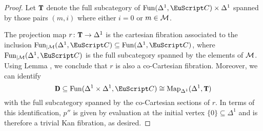 \begin{proof}
Let $\T$ denote the full subcategory of $\Fun(\Delta^1,\iC)\times \Delta^1$ spanned by those pairs $(m, i)$ where either $i = 0$ or $m\in \mathcal{M}$. 

The projection map $r \colon \T\to \Delta^1$ is the cartesian fibration associated to the inclusion 
$\Fun_{|\M}(\Delta^1,\iC) \subseteq \Fun(\Delta^1,\iC)$, where $\Fun_{|\M}(\Delta^1,\iC)$ is the full subcategory spanned by the elements of $\mathcal{M}$.
Using Lemma , we conclude that $r$ is also a co-Cartesian fibration. Moreover, we can identify
\[\sD \subseteq \Fun(\Delta^1\times \Delta^1, \iC) \cong \mathrm{Map}_{\Delta^1} (\Delta^1, \T)\]
with the full subcategory spanned by the co-Cartesian sections of $r$. In terms of this identification, $p''$ is given by evaluation at the initial vertex $\{0\}\subseteq \Delta^1$ and is therefore a trivial Kan fibration, as desired.
\end{proof}


